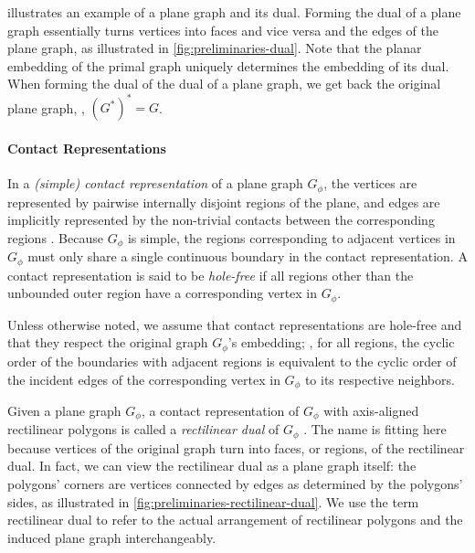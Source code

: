  illustrates an example of a plane graph and its dual.
Forming the dual of a plane graph essentially turns vertices into faces and vice versa and  the edges of the plane graph, as illustrated in \cref{fig:preliminaries-dual}.
Note that the planar embedding of the primal graph uniquely determines the embedding of its dual.
When forming the dual of the dual of a plane graph, we get back the original plane graph, \ie{}, $(G^*)^* = G$.



\paragraph{Contact Representations}

In a \emph{(simple) contact representation} of a plane graph $G_\phi$, the vertices are represented by pairwise internally disjoint regions of the plane, and edges are implicitly represented by the non-trivial contacts between the corresponding regions \cite{alam2013linear}.
Because $G_\phi$ is simple, the regions corresponding to adjacent vertices in $G_\phi$ must only share a single continuous boundary in the contact representation.
A contact representation is said to be \emph{hole-free} if all regions other than the unbounded outer region have a corresponding vertex in $G_\phi$.

Unless otherwise noted, we assume that contact representations are hole-free and that they respect the original graph $G_\phi$'s embedding; \ie{}, for all regions, the cyclic order of the boundaries with adjacent regions is equivalent to the cyclic order of the incident edges of the corresponding vertex in $G_\phi$ to its respective neighbors.

Given a plane graph $G_\phi$, a contact representation of $G_\phi$ with axis-aligned rectilinear polygons is called a \emph{rectilinear dual} of $G_\phi$ \cite{alam2013computing}.
The name  is fitting here because vertices of the original graph turn into faces, or regions, of the rectilinear dual.
In fact, we can view the rectilinear dual as a plane graph itself: the polygons' corners are vertices connected by edges as determined by the polygons' sides, as illustrated in \cref{fig:preliminaries-rectilinear-dual}.
We use the term rectilinear dual to refer to the actual arrangement of rectilinear polygons and the induced plane graph interchangeably.

